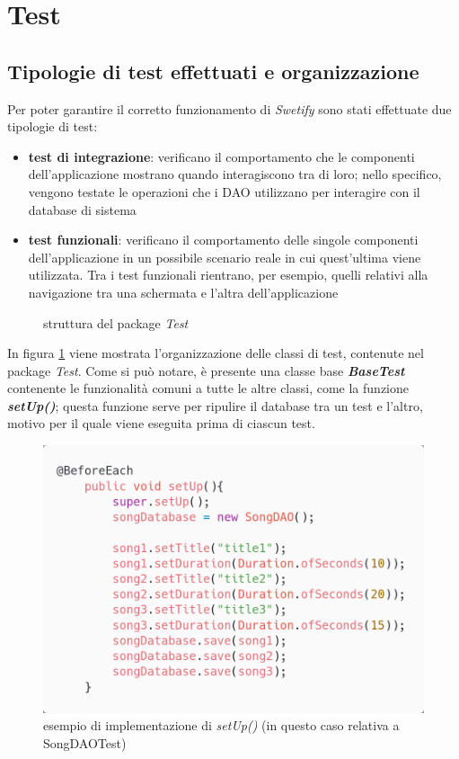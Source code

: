 \documentclass{article}
\begin{document}
  \section{Test}

  \subsection{Tipologie di test effettuati e organizzazione}

  Per poter garantire il corretto funzionamento di \textit{Swetify} sono stati effettuate due tipologie di test:
  \begin{itemize}
    \item \textbf{test di integrazione}: verificano il comportamento che le componenti dell'applicazione mostrano quando interagiscono tra di loro; nello specifico, vengono testate le operazioni che i DAO utilizzano per interagire con il database di sistema
    \item \textbf{test funzionali}: verificano il comportamento delle singole componenti dell'applicazione in un possibile scenario reale in cui quest'ultima viene utilizzata. Tra i test funzionali rientrano, per esempio, quelli relativi alla navigazione tra una schermata e l'altra dell'applicazione
  \end{itemize}

  \begin{figure}[H]
    \centering
    
    \caption{struttura del package \textit{Test}}
    \label{fig:testsUML}
  \end{figure}

  In figura \ref{fig:testsUML} viene mostrata l'organizzazione delle classi di test, contenute nel package \textit{Test}. Come si può notare, è presente una classe base \textbf{\textit{BaseTest}} contenente le funzionalità comuni a tutte le altre classi, come la funzione \textbf{\textit{setUp()}}; questa funzione serve per ripulire il database tra un test e l'altro, motivo per il quale viene eseguita prima di ciascun test.

  \begin{figure}[H]
    \centering
    \includegraphics[width=0.5\linewidth]{setUp.png}
    \caption{esempio di implementazione di \textit{setUp()} (in questo caso relativa a SongDAOTest)}
    \label{fig:setUp}
  \end{figure}
\end{document}
